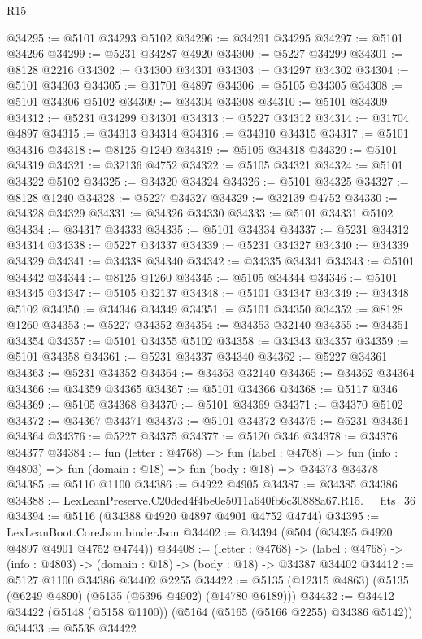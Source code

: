 \begin{lexlean}{R15}
\begin{coremodule}
{{{{{{{{{{{@34295 := @5101 @34293 @5102
@34296 := @34291 @34295
@34297 := @5101 @34296
@34299 := @5231 @34287 @4920
@34300 := @5227 @34299
@34301 := @8128 @2216
@34302 := @34300 @34301
@34303 := @34297 @34302
@34304 := @5101 @34303
@34305 := @31701 @4897
@34306 := @5105 @34305
@34308 := @5101 @34306 @5102
@34309 := @34304 @34308
@34310 := @5101 @34309
@34312 := @5231 @34299 @34301
@34313 := @5227 @34312
@34314 := @31704 @4897
@34315 := @34313 @34314
@34316 := @34310 @34315
@34317 := @5101 @34316
@34318 := @8125 @1240
@34319 := @5105 @34318
@34320 := @5101 @34319
@34321 := @32136 @4752
@34322 := @5105 @34321
@34324 := @5101 @34322 @5102
@34325 := @34320 @34324
@34326 := @5101 @34325
@34327 := @8128 @1240
@34328 := @5227 @34327
@34329 := @32139 @4752
@34330 := @34328 @34329
@34331 := @34326 @34330
@34333 := @5101 @34331 @5102
@34334 := @34317 @34333
@34335 := @5101 @34334
@34337 := @5231 @34312 @34314
@34338 := @5227 @34337
@34339 := @5231 @34327
@34340 := @34339 @34329
@34341 := @34338 @34340
@34342 := @34335 @34341
@34343 := @5101 @34342
@34344 := @8125 @1260
@34345 := @5105 @34344
@34346 := @5101 @34345
@34347 := @5105 @32137
@34348 := @5101 @34347
@34349 := @34348 @5102
@34350 := @34346 @34349
@34351 := @5101 @34350
@34352 := @8128 @1260
@34353 := @5227 @34352
@34354 := @34353 @32140
@34355 := @34351 @34354
@34357 := @5101 @34355 @5102
@34358 := @34343 @34357
@34359 := @5101 @34358
@34361 := @5231 @34337 @34340
@34362 := @5227 @34361
@34363 := @5231 @34352
@34364 := @34363 @32140
@34365 := @34362 @34364
@34366 := @34359 @34365
@34367 := @5101 @34366
@34368 := @5117 @346
@34369 := @5105 @34368
@34370 := @5101 @34369
@34371 := @34370 @5102
@34372 := @34367 @34371
@34373 := @5101 @34372
@34375 := @5231 @34361 @34364
@34376 := @5227 @34375
@34377 := @5120 @346
@34378 := @34376 @34377
@34384 := fun (letter : @4768) =>
  fun (label : @4768) =>
  fun (info : @4803) => fun (domain : @18) => fun (body : @18) => @34373 @34378
@34385 := @5110 @1100
@34386 := @4922 @4905
@34387 := @34385 @34386
@34388 := LexLeanPreserve.C20ded4f4be0e5011a640fb6c30888a67.R15.__fits_36
@34394 := @5116 (@34388 @4920 @4897 @4901 @4752 @4744)
@34395 := LexLeanBoot.CoreJson.binderJson
@34402 := @34394 (@504 (@34395 @4920 @4897 @4901 @4752 @4744))
@34408 := (letter : @4768) ->
  (label : @4768) -> (info : @4803) -> (domain : @18) -> (body : @18) -> @34387 @34402
@34412 := @5127 @1100 @34386 @34402 @2255
@34422 := @5135 (@12315 @4863) (@5135 (@6249 @4890) (@5135 (@5396 @4902) (@14780 @6189)))
@34432 := @34412 @34422 (@5148 (@5158 @1100)) (@5164 (@5165 (@5166 @2255) @34386 @5142))
@34433 := @5538 @34422
}}}}}}}}}}}
\end{coremodule}
\end{lexlean}

